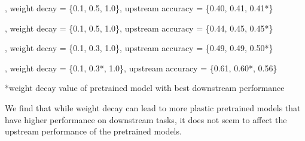 \llamazeropointfiveB{}, weight decay = \{0.1, 0.5, 1.0\}, upstream accuracy = \{0.40, 0.41, 0.41*\}

\llamaoneB{}, weight decay = \{0.1, 0.5, 1.0\}, upstream accuracy = \{0.44, 0.45, 0.45*\}

\olmoonex{}, weight decay = \{0.1, 0.3, 1.0\}, upstream accuracy = \{0.49, 0.49, 0.50*\}

\olmosevenx{}, weight decay = \{0.1, 0.3*, 1.0\}, upstream accuracy = \{0.61, 0.60*, 0.56\}

*weight decay value of pretrained model with best downstream performance

We find that while weight decay can lead to more plastic pretrained models that have higher performance on downstream tasks, it does not seem to affect the upstream performance of the pretrained models. 